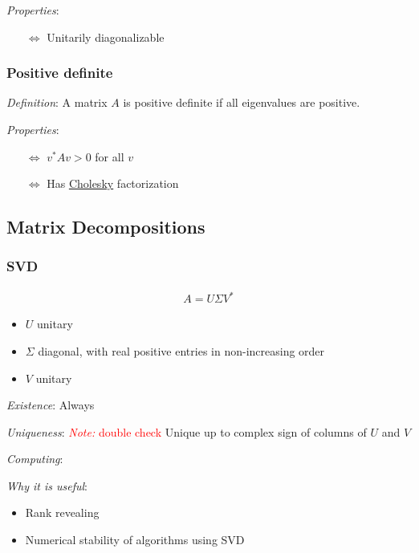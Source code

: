 \documentclass[12pt]{article}
\newcommand{\note}[1]{\textcolor{red}{\textit{Note:} #1}}
\begin{document}
\textit{Properties}:
\begin{itemize}[nolistsep]
    \item[\(\Leftrightarrow\)] Unitarily diagonalizable  
\end{itemize}


\subsubsection{Positive definite}
\textit{Definition}: A matrix \( A \) is positive definite if all eigenvalues are positive.

\textit{Properties}:
\begin{itemize}[nolistsep]
    \item[\(\Leftrightarrow\)] \( v^*Av > 0 \) for all \( v \)
    \item[\(\Leftrightarrow\)] Has \hyperref[sec:cholesky]{Cholesky} factorization
\end{itemize}

\subsection{Matrix Decompositions}

\subsubsection{SVD}
\begin{align*}
    A = U\Sigma V^*
\end{align*}

\begin{itemize}[nolistsep]
    \item \( U \) unitary
    \item \( \Sigma \) diagonal, with real positive entries in non-increasing order
    \item \( V \) unitary
\end{itemize}

\textit{Existence}:
Always

\textit{Uniqueness}:
\note{double check}
Unique up to complex sign of columns of \( U \) and \( V \)

\textit{Computing}:


\textit{Why it is useful}:
\begin{itemize}[nolistsep]
    \item Rank revealing
    \item Numerical stability of algorithms using SVD
\end{itemize}
\end{document}
